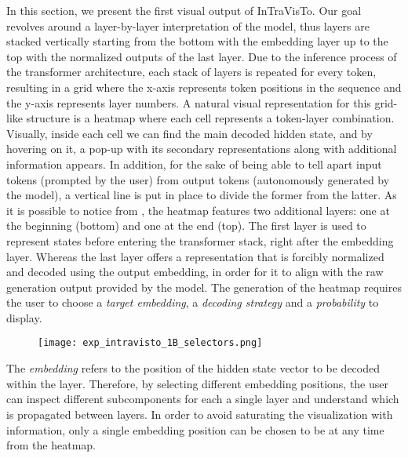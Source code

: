 In this section, we present the first visual output of InTraVisTo.
Our goal revolves around a layer-by-layer interpretation of the model, thus layers are stacked vertically starting from the bottom with the embedding layer up to the top with the normalized outputs of the last layer.
Due to the inference process of the transformer architecture, each stack of layers is repeated for every token, resulting in a grid where the x-axis represents token positions in the sequence and the y-axis represents layer numbers.
A natural visual representation for this grid-like structure is a heatmap where each cell represents a token-layer combination.
Visually, inside each cell we can find the main decoded hidden state, and by hovering on it, a pop-up with its secondary representations along with additional information appears.
In addition, for the sake of being able to tell apart input tokens (prompted by the user) from output tokens (autonomously generated by the model), a vertical line is put in place to divide the former from the latter.
As it is possible to notice from , the heatmap features two additional layers: one at the beginning (bottom) and one at the end (top).
The first layer is used to represent states before entering the transformer stack, right after the embedding layer.
Whereas the last layer offers a representation that is forcibly normalized and decoded using the output embedding, in order for it to align with the raw generation output provided by the model.
The generation of the heatmap requires the user to choose a \emph{target embedding}, a \emph{decoding strategy} and a \emph{probability} to display.

\begin{figure}[t!]
    \centering
    \texttt{[image: exp\_intravisto\_1B\_selectors.png]}
    \caption{}
    \label{fig:exp_intravisto_1_B}
\end{figure}

The \emph{embedding} refers to the position of the hidden state vector to be decoded within the layer.
Therefore, by selecting different embedding positions, the user can inspect different subcomponents for each a single layer and understand which  is propagated between layers. 
In order to avoid saturating the visualization with information, only a single embedding position can be chosen to be  at any time from the heatmap.

